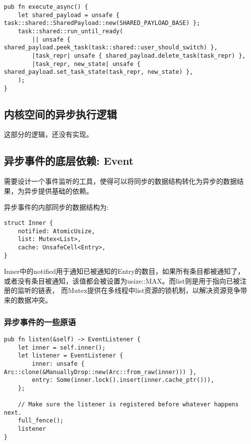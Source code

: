 \begin{lstlisting}[caption=用户空间的异步逻辑]
pub fn execute_async() {
    let shared_payload = unsafe { task::shared::SharedPayload::new(SHARED_PAYLOAD_BASE) };
    task::shared::run_until_ready(
        || unsafe { shared_payload.peek_task(task::shared::user_should_switch) },
        |task_repr| unsafe { shared_payload.delete_task(task_repr) },
        |task_repr, new_state| unsafe { shared_payload.set_task_state(task_repr, new_state) },
    );
}
\end{lstlisting}

\subsection{内核空间的异步执行逻辑}

这部分的逻辑，还没有实现。


\subsection{异步事件的底层依赖: Event}

需要设计一个事件监听的工具，使得可以将同步的数据结构转化为异步的数据结果，为异步提供基础的依赖。

异步事件的内部同步的数据结构为:

\begin{lstlisting}[caption=异步事件底层的同步结构]
struct Inner {
    notified: AtomicUsize,
    list: Mutex<List>,
    cache: UnsafeCell<Entry>,
}
\end{lstlisting}

Inner中的notified用于通知已被通知的Entry的数目，如果所有条目都被通知了，或者没有条目被通知，该值都会被设置为usize::MAX。而list则是用于指向已被注册的监听的链表， 而Mutex提供在多线程中list资源的锁机制，以解决资源竞争带来的数据冲突。

\subsubsection{异步事件的一些原语}
\label{sssec:event}

\begin{lstlisting}[caption = 监听者的注册]
pub fn listen(&self) -> EventListener {
    let inner = self.inner();
    let listener = EventListener {
        inner: unsafe { Arc::clone(&ManuallyDrop::new(Arc::from_raw(inner))) },
        entry: Some(inner.lock().insert(inner.cache_ptr())),
    };

    // Make sure the listener is registered before whatever happens next.
    full_fence();
    listener
}
\end{lstlisting}

